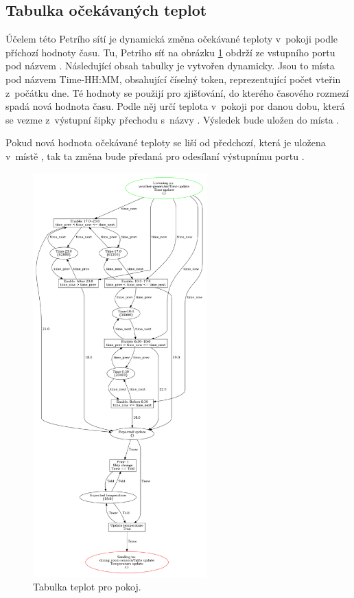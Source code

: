 \subsection{Tabulka očekávaných teplot}
\label{subsec:room-table}

Účelem této Petrího sítí je dynamická změna očekávané teploty v~pokoji podle příchozí hodnoty času. Tu, Petriho síť na obrázku \ref{room-table-viz} obdrží ze vstupního portu pod názvem . Následující obsah tabulky je vytvořen dynamicky. Jsou to místa pod názvem Time-HH:MM, obsahující číselný token, reprezentující  počet vteřin z~počátku dne. Té hodnoty se použijí pro zjišťování, do kterého časového rozmezí spadá nová hodnota času. Podle něj určí teplota v~pokoji por danou dobu, která se vezme z~výstupní šipky přechodu s~názvy . Výsledek bude uložen do místa .

Pokud nová hodnota očekávané teploty se liší od předchozí, která je uložena v~místě , tak ta změna bude předaná pro odesílaní výstupnímu portu .

\begin{figure}[htb]
 \centering
 \includegraphics[width=0.6\textwidth]{obrazky-figures/room-timetable.png}
 \caption{Tabulka teplot pro pokoj.}
 \label{room-table-viz}
\end{figure}

